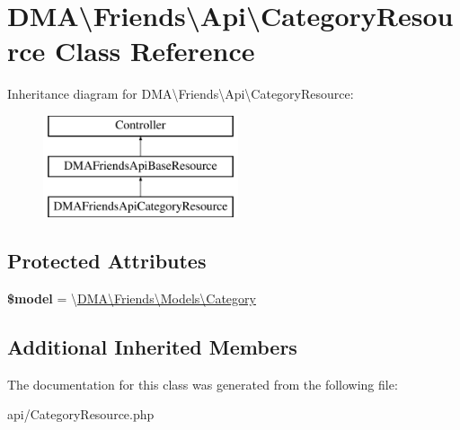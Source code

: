 \hypertarget{classDMA_1_1Friends_1_1Api_1_1CategoryResource}{}\section{D\+M\+A\textbackslash{}Friends\textbackslash{}Api\textbackslash{}Category\+Resource Class Reference}
\label{classDMA_1_1Friends_1_1Api_1_1CategoryResource}
Inheritance diagram for D\+M\+A\textbackslash{}Friends\textbackslash{}Api\textbackslash{}Category\+Resource\+:\begin{figure}[H]
\begin{center}
\leavevmode
\includegraphics[height=3.000000cm]{d6/d3b/classDMA_1_1Friends_1_1Api_1_1CategoryResource}
\end{center}
\end{figure}
\subsection*{Protected Attributes}
\begin{DoxyCompactItemize}
\item 
\hypertarget{classDMA_1_1Friends_1_1Api_1_1CategoryResource_ab6d62dffa329fabcda1eda6bc9e8a52e}{}{\bfseries \$model} = \textquotesingle{}\textbackslash{}\hyperlink{classDMA_1_1Friends_1_1Models_1_1Category}{D\+M\+A\textbackslash{}\+Friends\textbackslash{}\+Models\textbackslash{}\+Category}\textquotesingle{}\label{classDMA_1_1Friends_1_1Api_1_1CategoryResource_ab6d62dffa329fabcda1eda6bc9e8a52e}

\end{DoxyCompactItemize}
\subsection*{Additional Inherited Members}


The documentation for this class was generated from the following file\+:\begin{DoxyCompactItemize}
\item 
api/Category\+Resource.\+php\end{DoxyCompactItemize}
